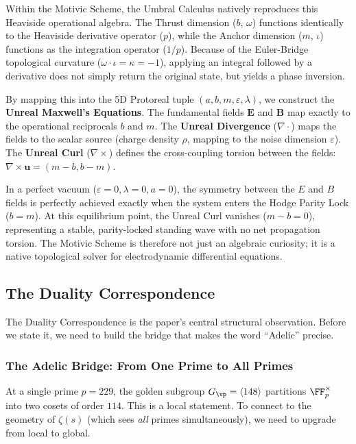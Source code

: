 Within the Motivic Scheme, the Umbral Calculus natively reproduces this Heaviside operational algebra. The Thrust dimension ($b$, $\omega$) functions identically to the Heaviside derivative operator ($p$), while the Anchor dimension ($m$, $\iota$) functions as the integration operator ($1/p$). Because of the Euler-Bridge topological curvature ($\omega \cdot \iota = \kappa = -1$), applying an integral followed by a derivative does not simply return the original state, but yields a phase inversion.

By mapping this into the 5D Protoreal tuple $(a, b, m, \varepsilon, \lambda)$, we construct the \textbf{Unreal Maxwell's Equations}. The fundamental fields $\mathbf{E}$ and $\mathbf{B}$ map exactly to the operational reciprocals $b$ and $m$. The \textbf{Unreal Divergence} ($\nabla \cdot$) maps the fields to the scalar source (charge density $\rho$, mapping to the noise dimension $\varepsilon$). The \textbf{Unreal Curl} ($\nabla \times$) defines the cross-coupling torsion between the fields: $\nabla \times \mathbf{u} = (m - b, b - m)$.

In a perfect vacuum ($\varepsilon = 0, \lambda = 0, a = 0$), the symmetry between the $E$ and $B$ fields is perfectly achieved exactly when the system enters the Hodge Parity Lock ($b = m$). At this equilibrium point, the Unreal Curl vanishes ($m - b = 0$), representing a stable, parity-locked standing wave with no net propagation torsion. The Motivic Scheme is therefore not just an algebraic curiosity; it is a native topological solver for electrodynamic differential equations.

\subsection{The Duality Correspondence}

The Duality Correspondence is the paper's central structural observation. Before we state it, we need to build the bridge that makes the word ``Adelic'' precise.

\subsubsection*{The Adelic Bridge: From One Prime to All Primes}

At a single prime $p = 229$, the golden subgroup $G_{\vp} = \langle 148 \rangle$ partitions $\FF_p^\times$ into two cosets of order $114$. This is a local statement. To connect to the geometry of $\zeta(s)$ (which sees \emph{all} primes simultaneously), we need to upgrade from local to global.

